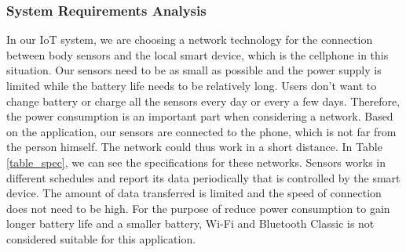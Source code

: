\documentclass[10pt,journal,final,a4paper,nofonttune]{IEEEtran}
\begin{document}
\subsubsection*{System Requirements Analysis}
In our IoT system, we are choosing a network technology for the connection between body sensors and the local smart device, which is the cellphone in this situation. Our sensors need to be as small as possible and the power supply is limited while the battery life needs to be relatively long. Users don't want to change battery or charge all the sensors every day or every a few days. Therefore, the power consumption is an important part when considering a network. Based on the application, our sensors are connected to the phone, which is not far from the person himself. The network could thus work in a short distance. In Table \ref{table_spec}, we can see the specifications for these networks. Sensors works in different schedules and report its data periodically that is controlled by the smart device. The amount of data transferred is limited and the speed of connection does not need to be high. For the purpose of reduce power consumption to gain longer battery life and a smaller battery, Wi-Fi and Bluetooth Classic is not considered suitable for this application. 

\begin{table}[!t]
\renewcommand{\arraystretch}{1.3}
\caption{Technical Specification of Various Networks}
\label{table_spec}
\centering
{}
\end{table}
\end{document}
